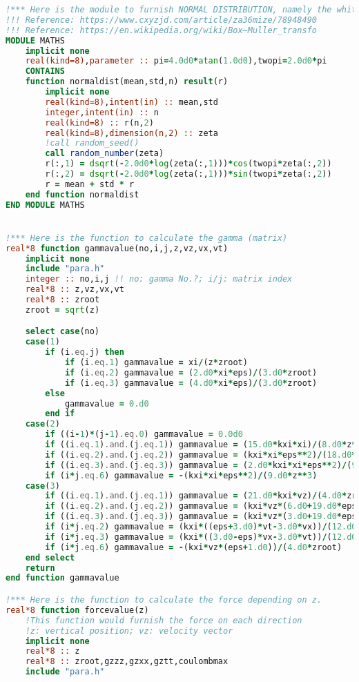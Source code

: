 \documentclass[fleqn,10pt]{InternshipReport_SI-ENS-PSL}
\begin{document}
\begin{lstlisting}[language=Fortran, caption=BEHD\_YYE.f90]
!*** Here is the module to furnish NORMAL DISTRIBUTION, namely the white noises.
!!! Reference: https://www.cxyzjd.com/article/za36mize/78948490
!!! Reference: https://en.wikipedia.org/wiki/Box–Muller_transfo
MODULE MATHS
    implicit none
    real(kind=8),parameter :: pi=4.0d0*atan(1.0d0),twopi=2.0d0*pi
    CONTAINS
    function normaldist(mean,std,n) result(r)
        implicit none
        real(kind=8),intent(in) :: mean,std
        integer,intent(in) :: n
        real(kind=8) :: r(n,2)
        real(kind=8),dimension(n,2) :: zeta
        !call random_seed()
        call random_number(zeta)
        r(:,1) = dsqrt(-2.0d0*log(zeta(:,1)))*cos(twopi*zeta(:,2))
        r(:,2) = dsqrt(-2.0d0*log(zeta(:,1)))*sin(twopi*zeta(:,2))
        r = mean + std * r
    end function normaldist
END MODULE MATHS


!*** Here is the function to calculate the gamma (matrix)
real*8 function gammavalue(no,i,j,z,vz,vx,vt)
    implicit none
    include "para.h"
    integer :: no,i,j !! no: gamma No.?; i/j: matrix index
    real*8 :: z,vz,vx,vt
    real*8 :: zroot
    zroot = sqrt(z)

    select case(no)
    case(1)
        if (i.eq.j) then
            if (i.eq.1) gammavalue = xi/(z*zroot)
            if (i.eq.2) gammavalue = (2.d0*xi*eps)/(3.d0*zroot)
            if (i.eq.3) gammavalue = (4.d0*xi*eps)/(3.d0*zroot)
        else
            gammavalue = 0.d0
        end if
    case(2)
        if ((i-1)*(j-1).eq.0) gammavalue = 0.0d0
        if ((i.eq.1).and.(j.eq.1)) gammavalue = (15.d0*kxi*xi)/(8.d0*z**4)
        if ((i.eq.2).and.(j.eq.2)) gammavalue = (kxi*xi*eps**2)/(18.d0*z**3)
        if ((i.eq.3).and.(j.eq.3)) gammavalue = (2.d0*kxi*xi*eps**2)/(9.d0*z**3)
        if (i*j.eq.6) gammavalue = -(kxi*xi*eps**2)/(9.d0*z**3)
    case(3)
        if ((i.eq.1).and.(j.eq.1)) gammavalue = (21.d0*kxi*vz)/(4.d0*zroot*z**4)
        if ((i.eq.2).and.(j.eq.2)) gammavalue = (kxi*vz*(6.d0+19.d0*eps))/(24.d0*zroot*z**3)
        if ((i.eq.3).and.(j.eq.3)) gammavalue = (kxi*vz*(3.d0+19.d0*eps))/(12.d0*zroot*z**3)
        if (i*j.eq.2) gammavalue = (kxi*((eps+3.d0)*vt-3.d0*vx))/(12.d0*zroot*z**3)
        if (i*j.eq.3) gammavalue = (kxi*((3.d0-eps)*vx-3.d0*vt))/(12.d0*zroot*z**3)
        if (i*j.eq.6) gammavalue = -(kxi*vz*(eps+1.d0))/(4.d0*zroot)
    end select
    return
end function gammavalue

!*** Here is the function to calculate the force depending on z.
real*8 function forcevalue(z)
    !This function would furnish the force on each direction
    !z: vertical position; vz: velocity vector
    implicit none
    real*8 :: z
    real*8 :: zroot,gzzz,gzxx,gztt,coulombmax
    include "para.h"
    

\end{lstlisting}
\end{document}
